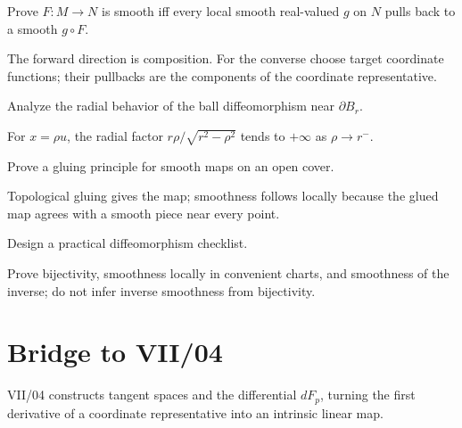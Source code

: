 \begin{problem}[Challenge]\label{chal:vii03-02}
Prove \(F:M\to N\) is smooth iff every local smooth real-valued \(g\) on \(N\) pulls back to a smooth \(g\circ F\).
\end{problem}
\begin{solution}
The forward direction is composition. For the converse choose target coordinate functions; their pullbacks are the components of the coordinate representative.
\end{solution}

\begin{problem}[Challenge]\label{chal:vii03-03}
Analyze the radial behavior of the ball diffeomorphism near \(\partial B_r\).
\end{problem}
\begin{solution}
For \(x=\rho u\), the radial factor \(r\rho/\sqrt{r^2-\rho^2}\) tends to \(+\infty\) as \(\rho\to r^{-}\).
\end{solution}

\begin{problem}[Challenge]\label{chal:vii03-04}
Prove a gluing principle for smooth maps on an open cover.
\end{problem}
\begin{solution}
Topological gluing gives the map; smoothness follows locally because the glued map agrees with a smooth piece near every point.
\end{solution}

\begin{problem}[Challenge]\label{chal:vii03-05}
Design a practical diffeomorphism checklist.
\end{problem}
\begin{solution}
Prove bijectivity, smoothness locally in convenient charts, and smoothness of the inverse; do not infer inverse smoothness from bijectivity.
\end{solution}

\section*{Bridge to VII/04}
VII/04 constructs tangent spaces and the differential \(dF_p\), turning the first derivative of a coordinate representative into an intrinsic linear map.
